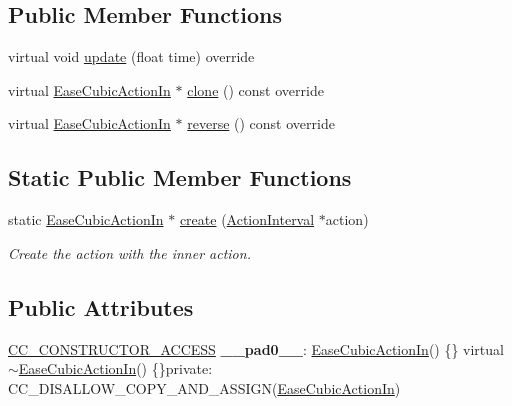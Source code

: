 \subsection*{Public Member Functions}
\begin{DoxyCompactItemize}
\item 
virtual void \hyperlink{classEaseCubicActionIn_a245bc3028244567a11dbe02bc2e11a10}{update} (float time) override
\item 
virtual \hyperlink{classEaseCubicActionIn}{Ease\+Cubic\+Action\+In} $\ast$ \hyperlink{classEaseCubicActionIn_a710f732cc78c6ef8d4697d4bd0021b3e}{clone} () const override
\item 
virtual \hyperlink{classEaseCubicActionIn}{Ease\+Cubic\+Action\+In} $\ast$ \hyperlink{classEaseCubicActionIn_aebf0f24c3890ea180706332f02d41b64}{reverse} () const override
\end{DoxyCompactItemize}
\subsection*{Static Public Member Functions}
\begin{DoxyCompactItemize}
\item 
static \hyperlink{classEaseCubicActionIn}{Ease\+Cubic\+Action\+In} $\ast$ \hyperlink{classEaseCubicActionIn_a6e262f37b03a5485646976f415658005}{create} (\hyperlink{classActionInterval}{Action\+Interval} $\ast$action)
\begin{DoxyCompactList}\small\item\em Create the action with the inner action. \end{DoxyCompactList}\end{DoxyCompactItemize}
\subsection*{Public Attributes}
\begin{DoxyCompactItemize}
\item 
\mbox{\label{classEaseCubicActionIn_a65c37049d312eeca66b6325a4266edb1}} 
\hyperlink{_2cocos2d_2cocos_2base_2ccConfig_8h_a25ef1314f97c35a2ed3d029b0ead6da0}{C\+C\+\_\+\+C\+O\+N\+S\+T\+R\+U\+C\+T\+O\+R\+\_\+\+A\+C\+C\+E\+SS} {\bfseries \+\_\+\+\_\+pad0\+\_\+\+\_\+}\+: \hyperlink{classEaseCubicActionIn}{Ease\+Cubic\+Action\+In}() \{\} virtual $\sim$\hyperlink{classEaseCubicActionIn}{Ease\+Cubic\+Action\+In}() \{\}private\+: C\+C\+\_\+\+D\+I\+S\+A\+L\+L\+O\+W\+\_\+\+C\+O\+P\+Y\+\_\+\+A\+N\+D\+\_\+\+A\+S\+S\+I\+GN(\hyperlink{classEaseCubicActionIn}{Ease\+Cubic\+Action\+In})
\end{DoxyCompactItemize}
